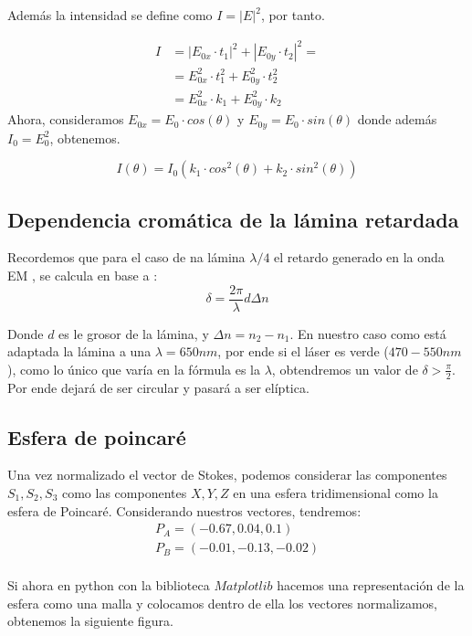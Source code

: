 \documentclass[11pt, a4paper, twocolumn]{article}
\begin{document}
Además la intensidad se define como $I = \left|E\right|^{2}$, por tanto.

\begin{align}
    I &= \left|E_{0x} \cdot t_{1}\right|^{2} + \left|E_{0y} \cdot t_{2}\right|^{2} = \\
    &= E_{0x}^{2} \cdot t_{1}^{2} + E_{0y}^{2} \cdot t_{2}^{2} \\
    &= E_{0x}^{2} \cdot k_{1} + E_{0y}^{2} \cdot k_{2}
\end{align}
Ahora, consideramos $E_{0x} = E_{0} \cdot cos(\theta)$ y $E_{0y} = E_{0} \cdot sin(\theta)$ donde además $I_{0} = E_{0}^{2}$, obtenemos.

\begin{equation}
    I (\theta) = I_{0} (k_{1} \cdot cos^{2}(\theta) + k_{2} \cdot sin^{2}(\theta))
\end{equation}

\subsection{Dependencia cromática de la lámina retardada}
Recordemos que para el caso de na lámina $\lambda/4 $ el retardo generado en la onda EM , se calcula en base a :
\begin{equation}
    \delta = \frac{2\pi}{\lambda}d \Delta n 
\end{equation}

Donde $d$ es le grosor de la lámina, y $\Delta n= n_{2} - n_{1}$. En nuestro caso como está adaptada la lámina a
una $\lambda = 650 nm$, por ende si el láser es verde ($470 - 550 nm$), como lo único que varía en la fórmula es la $\lambda$, 
obtendremos un valor de $\delta > \frac{\pi}{2}$. Por ende dejará de ser circular y pasará a ser elíptica.
 

\subsection{Esfera de poincaré}
Una vez normalizado el vector de Stokes, podemos considerar las componentes $S_{1}, S_{2}, S_{3}$ como las componentes $X, Y, Z$
en una esfera tridimensional como la esfera de Poincaré. Considerando nuestros vectores, tendremos: 
\begin{align}
    P_{A} = (-0.67, 0.04, 0.1) \\
    P_{B} = (-0.01, -0.13, -0.02) \\
\end{align}

Si ahora en python con la biblioteca $Matplotlib$ hacemos una representación de la esfera como una malla y colocamos dentro de ella los vectores
normalizamos, obtenemos la siguiente figura. 
\end{document}
